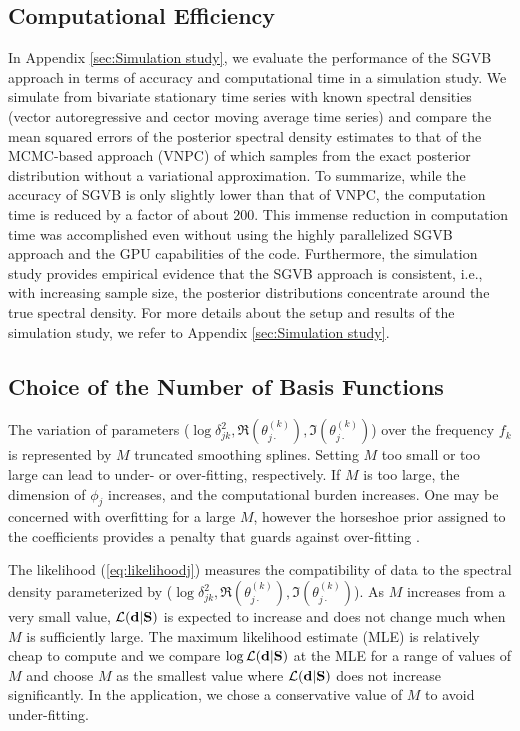\documentclass[%
 reprint,
 amsmath,amssymb,
 aps,
]{revtex4-2}
\begin{document}
\subsection{Computational Efficiency} \label{subsec:simulationstudy}
In Appendix \ref{sec:Simulation study}, we evaluate the performance of the SGVB approach in terms of accuracy and computational time in a simulation study. We simulate from bivariate stationary time series with known spectral densities (vector autoregressive and cector moving average time series) and compare the mean squared errors of the posterior spectral density estimates to that of the MCMC-based approach (VNPC) of \cite{LiuYixuan2024Ancl} which samples from the exact posterior distribution without a variational approximation. 
To summarize, while the accuracy of SGVB is only slightly lower than that of VNPC, the computation time is reduced by a factor of about 200.
This immense reduction in computation time was accomplished even without using the highly parallelized SGVB approach and the GPU capabilities of the code. Furthermore, the simulation study provides empirical evidence that the SGVB approach is consistent, i.e., with increasing sample size, the posterior distributions concentrate around the true spectral density. 
For more details about the setup and results of the simulation study, we refer to  Appendix \ref{sec:Simulation study}.

\subsection{Choice of the Number of Basis Functions} \label{subsec:number}

The variation of parameters ($\log \delta^2_{jk},\Re(\theta^{(k)}_{j\cdot}),\Im(\theta^{(k)}_{j\cdot})$) over the frequency $f_k$ is represented by $M$ truncated smoothing splines. Setting $M$ too small or too large can lead to under- or over-fitting, respectively. If $M$ is too large, the dimension of $\phi_j$ increases, and the computational burden increases. One may be concerned with overfitting for a large $M$, however the horseshoe prior assigned to the coefficients provides a penalty that guards against over-fitting \citep{10.1214/17-EJS1337SI}.

The likelihood (\ref{eq:likelihoodj}) measures the compatibility of data to the spectral density parameterized by ($\log \delta^2_{jk},\Re(\theta^{(k)}_{j\cdot}),\Im(\theta^{(k)}_{j\cdot})$). As $M$ increases from a very small value, $\mathcal{L}({\bf d}|{\bf S})$ is expected to increase and does not change much when $M$ is sufficiently large. The maximum likelihood estimate (MLE) is relatively cheap to compute and we compare $\log \mathcal{L}({\bf d}|{\bf S})$ at the MLE for a range of values of $M$ and choose $M$ as the smallest value where $\mathcal{L}({\bf d}|{\bf S})$ does not increase significantly. In the application, we chose a conservative value of $M$ to avoid under-fitting. 
 
\end{document}

